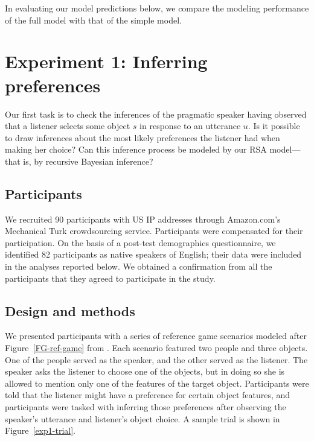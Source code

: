 \documentclass[11pt,a4paper]{article}
\begin{document}
In evaluating our model predictions below, we compare the modeling performance of the full model with that of the simple model.


\section{Experiment 1: Inferring preferences} \label{experiment1}

Our first task is to check the inferences of the pragmatic speaker having observed that a listener selects some object $s$ in response to an utterance $u$. 
Is it possible to draw inferences about the most likely preferences the listener had when making her choice? 
Can this inference process be modeled by our RSA model---that is, by recursive Bayesian inference?



\subsection{Participants}

We recruited 90 participants with US IP addresses through Amazon.com's Mechanical Turk crowdsourcing service. Participants were compensated for their participation. On the basis of a post-test demographics questionnaire, we identified 82 participants as native speakers of English; their data were included in the analyses reported below. We obtained a confirmation from all the participants that they agreed to participate in the study.

\subsection{Design and methods}

We presented participants with a series of reference game scenarios modeled after Figure~\ref{FG-ref-game} from .
Each scenario featured two people and three objects.
One of the people served as the speaker, and the other served as the listener. The speaker asks the listener to choose one of the objects, but in doing so she is allowed to mention only one of the features of the target object. Participants were told that the listener might have a preference for certain object features, and participants were tasked with inferring those preferences after observing the speaker's utterance and listener's object choice. A sample trial is shown in Figure~\ref{exp1-trial}.
\end{document}
